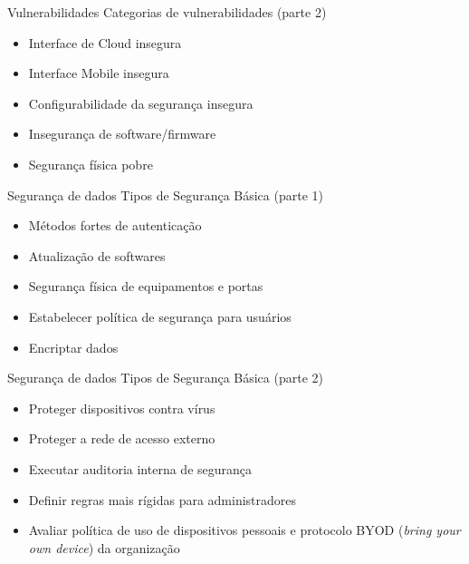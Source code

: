 \documentclass[t]{beamer}
\begin{document}
\begin{frame}{Vulnerabilidades}
Categorias de vulnerabilidades (parte 2)
\begin{itemize}
	\item Interface de Cloud insegura
	\item Interface Mobile insegura
	\item Configurabilidade da segurança insegura
	\item Insegurança de software/firmware
	\item Segurança física pobre
\end{itemize}
\end{frame}


\begin{frame}{Segurança de dados}
Tipos de Segurança Básica (parte 1)
\begin{itemize}
	\item Métodos fortes de autenticação
	\item Atualização de softwares
	\item Segurança física de equipamentos e portas
	\item Estabelecer política de segurança para usuários
	\item Encriptar dados
\end{itemize}
\end{frame}

\begin{frame}{Segurança de dados}
Tipos de Segurança Básica (parte 2)
\begin{itemize}
\item Proteger dispositivos contra vírus
\item Proteger a rede de acesso externo
\item Executar auditoria interna de segurança
\item Definir regras mais rígidas para administradores
\item Avaliar política de uso de dispositivos pessoais e protocolo BYOD (\textit{bring your own device}) da organização
\end{itemize}
\end{frame}

\frame{\titlepage}
\end{document}
